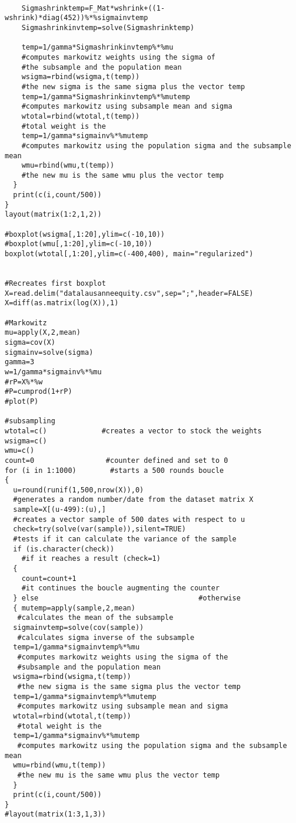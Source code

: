 \begin{appendices}
\begin{verbatim}
      
    Sigmashrinktemp=F_Mat*wshrink+((1-wshrink)*diag(452))%*%sigmainvtemp
    Sigmashrinkinvtemp=solve(Sigmashrinktemp)
    
    temp=1/gamma*Sigmashrinkinvtemp%*%mu            
    #computes markowitz weights using the sigma of
    #the subsample and the population mean
    wsigma=rbind(wsigma,t(temp))              
    #the new sigma is the same sigma plus the vector temp
    temp=1/gamma*Sigmashrinkinvtemp%*%mutemp        
    #computes markowitz using subsample mean and sigma
    wtotal=rbind(wtotal,t(temp))             
    #total weight is the 
    temp=1/gamma*sigmainv%*%mutemp            
    #computes markowitz using the population sigma and the subsample mean
    wmu=rbind(wmu,t(temp))                    
    #the new mu is the same wmu plus the vector temp 
  }
  print(c(i,count/500))
}
layout(matrix(1:2,1,2))

#boxplot(wsigma[,1:20],ylim=c(-10,10))
#boxplot(wmu[,1:20],ylim=c(-10,10))
boxplot(wtotal[,1:20],ylim=c(-400,400), main="regularized")


#Recreates first boxplot
X=read.delim("datalausanneequity.csv",sep=";",header=FALSE)
X=diff(as.matrix(log(X)),1)

#Markowitz
mu=apply(X,2,mean)
sigma=cov(X)
sigmainv=solve(sigma)
gamma=3
w=1/gamma*sigmainv%*%mu
#rP=X%*%w
#P=cumprod(1+rP)
#plot(P)

#subsampling
wtotal=c()             #creates a vector to stock the weights
wsigma=c()
wmu=c()
count=0                 #counter defined and set to 0
for (i in 1:1000)        #starts a 500 rounds boucle
{
  u=round(runif(1,500,nrow(X)),0)               
  #generates a random number/date from the dataset matrix X
  sample=X[(u-499):(u),]                        
  #creates a vector sample of 500 dates with respect to u
  check=try(solve(var(sample)),silent=TRUE)     
  #tests if it can calculate the variance of the sample
  if (is.character(check))                      
    #if it reaches a result (check=1)
  {
    count=count+1                             
    #it continues the boucle augmenting the counter
  } else                                      #otherwise
  { mutemp=apply(sample,2,mean)               
   #calculates the mean of the subsample
  sigmainvtemp=solve(cov(sample))           
   #calculates sigma inverse of the subsample
  temp=1/gamma*sigmainvtemp%*%mu            
   #computes markowitz weights using the sigma of the
   #subsample and the population mean
  wsigma=rbind(wsigma,t(temp))              
   #the new sigma is the same sigma plus the vector temp
  temp=1/gamma*sigmainvtemp%*%mutemp        
   #computes markowitz using subsample mean and sigma
  wtotal=rbind(wtotal,t(temp))              
   #total weight is the 
  temp=1/gamma*sigmainv%*%mutemp            
   #computes markowitz using the population sigma and the subsample mean
  wmu=rbind(wmu,t(temp))                    
   #the new mu is the same wmu plus the vector temp 
  }
  print(c(i,count/500))
}
#layout(matrix(1:3,1,3))


\end{verbatim}
\end{appendices}
